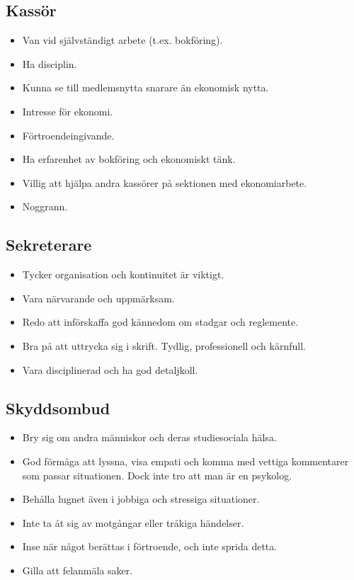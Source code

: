 \documentclass[a4paper]{article}
\begin{document}
\subsection*{Kassör}
\begin{itemize}
\item Van vid självständigt arbete (t.ex. bokföring).
\item Ha disciplin.
\item Kunna se till medlemsnytta snarare än ekonomisk nytta.
\item Intresse för ekonomi.
\item Förtroendeingivande.
\item Ha erfarenhet av bokföring och ekonomiskt tänk.
\item Villig att hjälpa andra kassörer på sektionen med ekonomiarbete.
\item Noggrann.
\end{itemize}

\subsection*{Sekreterare}
\begin{itemize}
\item Tycker organisation och kontinuitet är viktigt.
\item Vara närvarande och uppmärksam.
\item Redo att införskaffa god kännedom om stadgar och reglemente.
\item Bra på att uttrycka sig i skrift. Tydlig, professionell och kärnfull.
\item Vara disciplinerad och ha god detaljkoll.
\end{itemize}

\subsection*{Skyddsombud}
\begin{itemize}
\item Bry sig om andra människor och deras studiesociala hälsa.
\item God förmåga att lyssna, visa empati och komma med vettiga kommentarer som passar situationen. Dock inte tro att man är en psykolog.
\item Behålla lugnet även i jobbiga och stressiga situationer. 
\item Inte ta åt sig av motgångar eller tråkiga händelser.
\item Inse när något berättas i förtroende, och inte sprida detta. 
\item Gilla att felanmäla saker.
\end{itemize}
        
\end{document}
